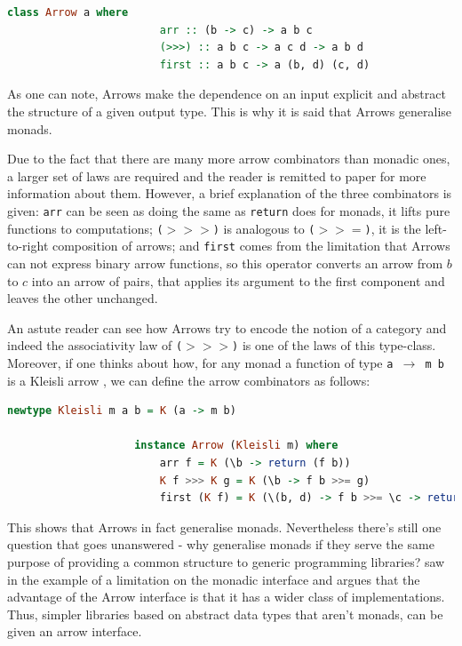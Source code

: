 \documentclass[
  oneside,
  11pt, a4paper,
  footinclude=true,
  headinclude=true,
  cleardoublepage=empty
]{scrbook}
\theoremstyle{definition}
\theoremstyle{definition}
\begin{document}
                \begin{lstlisting}[language=Haskell, caption={Arrow type-class},captionpos=b]
                    class Arrow a where
                        arr :: (b -> c) -> a b c
                        (>>>) :: a b c -> a c d -> a b d
                        first :: a b c -> a (b, d) (c, d)
    	        \end{lstlisting}{}
    	       
    As one can note, Arrows make the dependence on an input explicit and abstract the structure of a given output type. This is why it is said that Arrows generalise monads.
    	       
    Due to the fact that there are many more arrow combinators than monadic ones, a larger set of laws are required and the reader is remitted to \cite{Hughes:2000:GMA:347238.347246} paper for more information about them. However, a brief explanation of the three combinators is given: \texttt{arr} can be seen as doing the same as \texttt{return} does for monads, it lifts pure functions to computations; \texttt{($>>>$)} is analogous to \texttt{($>>=$)}, it is the left-to-right composition of arrows; and \texttt{first} comes from the limitation that Arrows can not express binary arrow functions, so this operator converts an arrow from $b$ to $c$ into an arrow of pairs, that applies its argument to the first component and leaves the other unchanged.
    	       
    An astute reader can see how Arrows try to encode the notion of a category and indeed the associativity law of \texttt{($>>>$)} is one of the laws of this type-class. Moreover, if one thinks about how, for any monad a function of type \texttt{a $\rightarrow$ m b} is a Kleisli arrow \citep{Awodey:2010:CT:2060081}, we can define the arrow combinators as follows:
    	        
                \begin{lstlisting}[mathescape, language=Haskell, caption={Arrow Kleisli type-class instance},captionpos=b]
                    newtype Kleisli m a b = K (a -> m b)
                
                    instance Arrow (Kleisli m) where
                        arr f = K (\b -> return (f b))
                        K f >>> K g = K (\b -> f b >>= g)
                        first (K f) = K (\(b, d) -> f b >>= \c -> return (c, d))
                \end{lstlisting}{}
                
    This shows that Arrows in fact generalise monads. Nevertheless there's still one question that goes unanswered - why generalise monads if they serve the same purpose of providing a common structure to generic programming libraries? \cite{Hughes:2000:GMA:347238.347246} saw in the example of \cite{swiestra&duponcheel} a limitation on the monadic interface and argues that the advantage of the Arrow interface is that it has a wider class of implementations. Thus, simpler libraries based on abstract data types that aren't monads, can be given an arrow interface.
                
\end{document}
